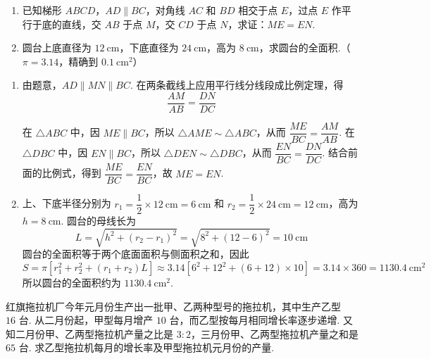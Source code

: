 \begin{problem}
\begin{enumerate}
\item 已知梯形 \(ABCD\)，\(AD\parallel BC\)，对角线 \(AC\) 和 \(BD\) 相交于点 \(E\)，过点 \(E\) 作平行于底的直线，交 \(AB\) 于点 \(M\)，交 \(CD\) 于点 \(N\)，求证：\(ME=EN\).

\item 圆台上底直径为 \(12\mathrm{~cm}\)，下底直径为 \(24\mathrm{~cm}\)，高为 \(8\mathrm{~cm}\)，求圆台的全面积.（\(\pi=3.14\)，精确到 \(0.1\mathrm{~cm}^2\)）
\end{enumerate}
\end{problem}

\begin{solution}
\begin{enumerate}
\item 由题意，\(AD\parallel MN\parallel BC\). 在两条截线上应用平行线分线段成比例定理，得
\[
\frac{AM}{AB}=\frac{DN}{DC}
\]


在 \(\triangle ABC\) 中，因 \(ME\parallel BC\)，所以 \(\triangle AME\sim\triangle ABC\)，从而 \(\dfrac{ME}{BC}=\dfrac{AM}{AB}\). 在 \(\triangle DBC\) 中，因 \(EN\parallel BC\)，所以 \(\triangle DEN\sim\triangle DBC\)，从而 \(\dfrac{EN}{BC}=\dfrac{DN}{DC}\). 结合前面的比例式，得到 \(\dfrac{ME}{BC}=\dfrac{EN}{BC}\)，故 \(ME=EN\).

\item 上、下底半径分别为 \(r_1=\dfrac12\times12\mathrm{~cm}=6\mathrm{~cm}\) 和 \(r_2=\dfrac12\times24\mathrm{~cm}=12\mathrm{~cm}\)，高为 \(h=8\mathrm{~cm}\). 圆台的母线长为
\[
L=\sqrt{h^2+\left(r_2-r_1\right)^2}=\sqrt{8^2+\left(12-6\right)^2}=10\mathrm{~cm}
\]
圆台的全面积等于两个底面面积与侧面积之和，因此
\[
S=\pi\left[r_1^2+r_2^2+\left(r_1+r_2\right)L\right]
\approx3.14\left[6^2+12^2+\left(6+12\right)\times10\right]
=3.14\times360=1130.4\mathrm{~cm}^2
\]
所以圆台的全面积约为 \(1130.4\mathrm{~cm}^2\).
\end{enumerate}
\end{solution}

\begin{problem}
红旗拖拉机厂今年元月份生产出一批甲、乙两种型号的拖拉机，其中生产乙型 \(16\text{ 台}\). 从二月份起，甲型每月增产 \(10\text{ 台}\)，而乙型按每月相同增长率逐步递增. 又知二月份甲、乙两型拖拉机产量之比是 \(3:2\)，三月份甲、乙两型拖拉机产量之和是 \(65\text{ 台}\). 求乙型拖拉机每月的增长率及甲型拖拉机元月份的产量.
\end{problem}


